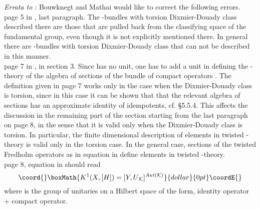 \documentclass[a4paper,reqno]{amsart}
\theoremstyle{plain}
\theoremstyle{definition}
\theoremstyle{remark}
\numberwithin{equation}{section}
\numberwithin{figure}{section}
\providecommand{\UK}{U{_\mathcal K}}
\providecommand{\<}{\langle}
\renewcommand{\>}{\rangle}
\begin{document}
\bigskip \noindent
{\it Errata to \cite{BM}}: Bouwknegt and Mathai would like to correct
the following errors.\\
\myHighlight{$\bullet$}\coordHE{} page 5 in \cite{BM}, last paragraph. The \coordHE{}-bundles with torsion
Dixmier-Douady class \myHighlight{$[H]$}\coordHE{} described there are those that are pulled back
from the classifying space of the fundamental group, even though it is
not explicitly mentioned there. In general there are
\coordHE{}-bundles with torsion
Dixmier-Douady class that can not be described in this manner.\\
\myHighlight{$\bullet$}\coordHE{} page 7 in \cite{BM}, in section 3. Since \coordHE{} has
no unit, one has
to add a unit in defining the \coordHE{}-theory of the algebra of sections
of the bundle of compact operators \coordHE{}. The definition
given in page 7 works only in the case when the Dixmier-Douady class
\myHighlight{$[H]$}\coordHE{} is torsion, since in this case it can be shown that that the relevant
algebra of sections has
an approximate identity of idempotents, cf. \cite{Bla} \S 5.5.4.
This affects the discussion in the remaining part of the section
starting from the last paragraph on page 8, in
the sense that it is valid only when the Dixmier-Douady class \myHighlight{$[H]$}\coordHE{}
is torsion. In particular, the finite dimensional description of
elements in twisted \coordHE{}-theory is valid only in the torsion case.
In the general case, sections of the twisted Fredholm
operators as in equation \coordHE{} in \cite{BM} define elements in
twisted \coordHE{}-theory. \\
\myHighlight{$\bullet$}\coordHE{} page 8, equation \coordHE{} in \cite{BM} should read
$$\coord{}\boxMath{K^1(X, [H]) = [Y, \UK]^{Aut(\mathcal K)}}{dollar}{0pt}\coordE{}$$
where \myHighlight{$\UK$}\coordHE{} is the group of unitaries on a
Hilbert space \coordHE{} of the form, identity operator
   + compact operator.
    
\end{document}
